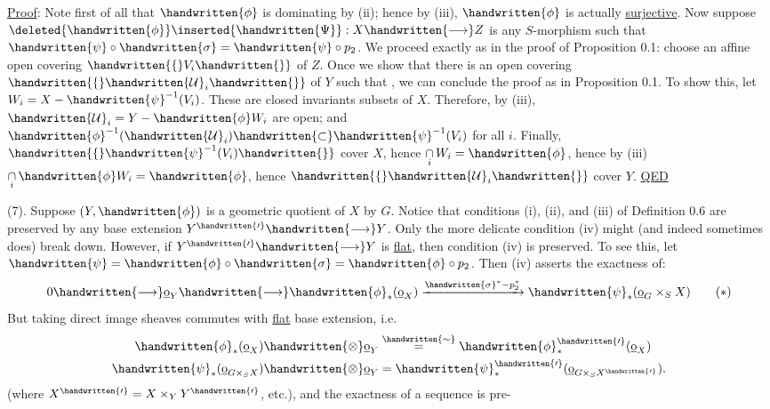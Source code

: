 \uline{Proof}: Note first of all that $\handwritten{\phi}$ is dominating by (ii); hence by (iii), $\handwritten{\phi}$ is actually \uline{surjective}. Now suppose $\deleted{\handwritten{\phi}}\inserted{\handwritten{\Psi}}:X\handwritten{\longrightarrow} Z$ is any $S$-morphism such that $\handwritten{\psi}\circ\handwritten{\sigma}=\handwritten{\psi}\circ p_2$. We proceed exactly as in the proof of Proposition 0.1: choose an affine open covering $\handwritten{\{}V_i\handwritten{\}}$ of $Z$. Once we show that there is an open covering $\handwritten{\{}\handwritten{\mathcal U}_i\handwritten{\}}$ of $Y$ such that , we can conclude the proof as in Proposition 0.1. To show this, let $W_i=X-\handwritten{\psi}^{-1}(V_i)$. These are closed invariants subsets of $X$. Therefore, by (iii), $\handwritten{\mathcal U}_i=Y-\handwritten{\phi} W_i$ are open; and $\handwritten{\phi}^{-1}(\handwritten{\mathcal U}_i)\handwritten{\subset}\handwritten{\psi}^{-1}(V_i)$ for all $i$. Finally, $\handwritten{\{}\handwritten{\psi}^{-1}(V_i)\handwritten{\}}$ cover $X$, hence $\underset{i}{\cap}\,W_i=\handwritten{\phi}$, hence by (iii) $\underset{i}{\cap}\,\handwritten{\phi} W_i=\handwritten{\phi}$, hence $\handwritten{\{}\handwritten{\mathcal U}_i\handwritten{\}}$ cover $Y$. \uline{QED}

(7). Suppose $(Y,\handwritten{\phi})$ is a geometric quotient of $X$ by $G$. Notice that conditions (i), (ii), and (iii) of Definition 0.6 are preserved by any base extension $Y^{\handwritten{\prime}}\handwritten{\longrightarrow} Y$. Only the more delicate condition (iv) might (and indeed sometimes does) break down. However, if $Y^{\handwritten{\prime}}\handwritten{\longrightarrow} Y$ is \uline{flat}, then condition (iv) is preserved. To see this, let $\handwritten{\psi}=\handwritten{\phi}\circ\handwritten{\sigma}=\handwritten{\phi}\circ p_2$. Then (iv) asserts the exactness of:
\[
0\handwritten{\longrightarrow} \underline{\mathrm{o}}_Y\handwritten{\longrightarrow} \handwritten{\phi}_*(\underline{\mathrm{o}}_X)\xrightarrow{\handwritten{\sigma}^*-p_2^*}\handwritten{\psi}_*(\underline{\mathrm{o}}_G\times_S X)
\tag*{$(*)$}
\]
But taking direct image sheaves commutes with \uline{flat} base extension, i.e.
\[
\begin{aligned}
\handwritten{\phi}_*(\underline{\mathrm{o}}_X)\handwritten{\otimes}\underline{\mathrm{o}}_Y &\mathrel{\overset{\handwritten{\sim}}{=}}\handwritten{\phi}^{\handwritten{\prime}}_*(\underline{\mathrm{o}}_X)\\
\handwritten{\psi}_*(\underline{\mathrm{o}}_{G\times_S X})\handwritten{\otimes}\underline{\mathrm{o}}_Y &=\handwritten{\psi}^{\handwritten{\prime}}_*(\underline{\mathrm{o}}_{G\times_S X^{\handwritten{\prime}}}).
\end{aligned}
\]
(where $X^{\handwritten{\prime}}=X\times_Y Y^{\handwritten{\prime}}$, etc.), and the exactness of a sequence is pre-

